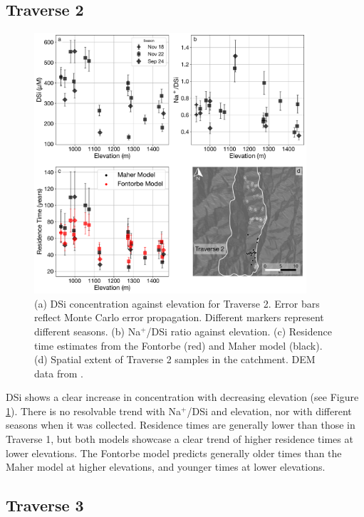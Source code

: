 \subsection{Traverse 2}

\begin{figure}[h]
    \centering
        \includegraphics[width=0.9\textwidth]{Traverse_2_summary.pdf}
    \caption{(a) DSi concentration against elevation for Traverse 2. Error bars reflect Monte Carlo error propagation. Different markers represent different seasons. (b) Na$^+$/DSi ratio against elevation. (c) Residence time estimates from the Fontorbe (red) and Maher model (black). (d) Spatial extent of Traverse 2 samples in the catchment. DEM data from \textcite{asterGlobalDigitalElevation2018}.}
    \label{fig:trav2}
\end{figure}

\FloatBarrier

DSi shows a clear increase in concentration with decreasing elevation (see Figure \ref{fig:trav2}). There is no resolvable trend with Na$^+$/DSi and elevation, nor with different seasons when it was collected. Residence times are generally lower than those in Traverse 1, but both models showcase a clear trend of higher residence times at lower elevations. The Fontorbe model predicts generally older times than the Maher model at higher elevations, and younger times at lower elevations. 



\subsection{Traverse 3}

